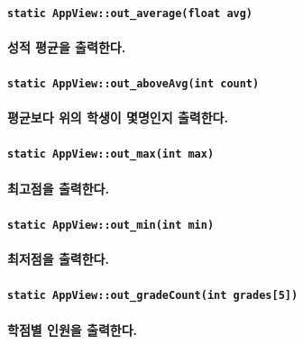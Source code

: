 \documentclass[UTF8]{report}
\begin{document}
            \paragraph{\texttt{static AppView::out\_average(float avg)}}
            \paragraph{%
                \normalfont 성적 평균을 출력한다.
            }

            \paragraph{\texttt{static AppView::out\_aboveAvg(int count)}}
            \paragraph{%
                \normalfont 평균보다 위의 학생이 몇명인지 출력한다.
            }

            \paragraph{\texttt{static AppView::out\_max(int max)}}
            \paragraph{%
                \normalfont 최고점을 출력한다.
            }

            \paragraph{\texttt{static AppView::out\_min(int min)}}
            \paragraph{%
                \normalfont 최저점을 출력한다.
            }
            
            \paragraph{\texttt{static AppView::out\_gradeCount(int grades[5])}}
            \paragraph{%
                \normalfont 학점별 인원을 출력한다.
            }
\end{document}
